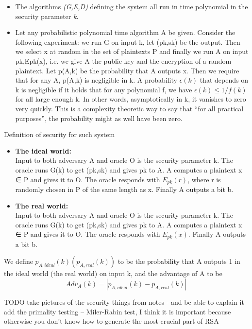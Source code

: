 \documentclass[a4paper,10pt]{article}
\begin{document}
\begin{itemize}
\item
The algorithms \textit{(G,E,D)} defining the system all run in time polynomial in the security parameter \textit{k}.
\item 
Let any probabilistic polynomial time algorithm A be given. Consider the following experiment:
we run G on input k, let (pk,sk) be the output. Then we select x at random in the set of
plaintexts P and finally we run A on input pk,Epk(x), i.e. we give A the public key and the
encryption of a random plaintext. Let p(A,k) be the probability that A outputs x. Then we
require that for any A, p(A,k) is negligible in k.
A probability $\epsilon(k)$ that depends on k is negligible if it holds that for any polynomial f, we have
$\epsilon(k) ≤ 1/f(k)$ for all large enough k. In other words, asymptotically in k, it vanishes to zero
very quickly. This is a complexity theoretic way to say that “for all practical purposes”, the
probability might as well have been zero.
\end{itemize}
Definition of security for such system
\begin{itemize}
\item[] \textbf{The ideal world:}\\
Input to both adversary A and oracle O is the security parameter k. The oracle runs G(k) to get (pk,sk) and gives pk to A. A computes a plaintext x ∈ P and gives it to O. The oracle responds with $E_{pk}(r)$, where r is randomly chosen in P of the same length as x.
Finally A outputs a bit b.

\item[] \textbf{The real world:}\\
Input to both adversary A and oracle O is the security parameter k. The oracle runs G(k) to get (pk,sk) and gives pk to A. A computes a plaintext x ∈ P and gives it to O.
The oracle responds with $E_{pk}(x)$. Finally A outputs a bit b.	
\end{itemize}
We define $p_{A,ideal}(k) (p_{A,real}(k))$ to be the probability that A outputs 1 in the ideal world (the real world) on input k, and the advantage of A to be
$$
Adv_A(k) = |p_{A,ideal}(k) - p_{A,real}(k)|
$$


TODO take pictures of the security things from notes - and be able to explain it
add the primality testing -- Miler-Rabin test, I think it is important because otherwise you don't know how to generate the most crucial part of RSA
\end{document}
